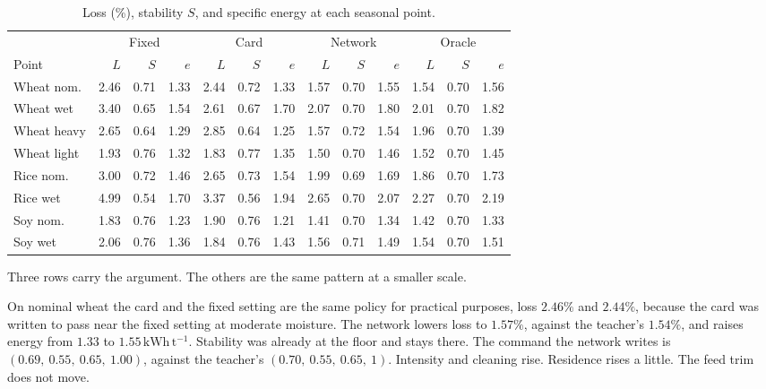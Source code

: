 \begin{table}[ht]
\centering
\caption{Loss (\%), stability \(S\), and specific energy at each seasonal point.}
\label{tab:pointsfull}
\small
\setlength{\tabcolsep}{4pt}
\begin{tabular}{@{}lrrrrrrrrrrrr@{}}
\toprule
& \multicolumn{3}{c}{Fixed} & \multicolumn{3}{c}{Card} & \multicolumn{3}{c}{Network} & \multicolumn{3}{c}{Oracle} \\
\cmidrule(lr){2-4}\cmidrule(lr){5-7}\cmidrule(lr){8-10}\cmidrule(lr){11-13}
Point & \(L\) & \(S\) & \(e\) & \(L\) & \(S\) & \(e\) & \(L\) & \(S\) & \(e\) & \(L\) & \(S\) & \(e\) \\
\midrule
Wheat nom. & 2.46 & 0.71 & 1.33 & 2.44 & 0.72 & 1.33 & 1.57 & 0.70 & 1.55 & 1.54 & 0.70 & 1.56 \\
Wheat wet & 3.40 & 0.65 & 1.54 & 2.61 & 0.67 & 1.70 & 2.07 & 0.70 & 1.80 & 2.01 & 0.70 & 1.82 \\
Wheat heavy & 2.65 & 0.64 & 1.29 & 2.85 & 0.64 & 1.25 & 1.57 & 0.72 & 1.54 & 1.96 & 0.70 & 1.39 \\
Wheat light & 1.93 & 0.76 & 1.32 & 1.83 & 0.77 & 1.35 & 1.50 & 0.70 & 1.46 & 1.52 & 0.70 & 1.45 \\
Rice nom. & 3.00 & 0.72 & 1.46 & 2.65 & 0.73 & 1.54 & 1.99 & 0.69 & 1.69 & 1.86 & 0.70 & 1.73 \\
Rice wet & 4.99 & 0.54 & 1.70 & 3.37 & 0.56 & 1.94 & 2.65 & 0.70 & 2.07 & 2.27 & 0.70 & 2.19 \\
Soy nom. & 1.83 & 0.76 & 1.23 & 1.90 & 0.76 & 1.21 & 1.41 & 0.70 & 1.34 & 1.42 & 0.70 & 1.33 \\
Soy wet & 2.06 & 0.76 & 1.36 & 1.84 & 0.76 & 1.43 & 1.56 & 0.71 & 1.49 & 1.54 & 0.70 & 1.51 \\
\bottomrule
\end{tabular}
\end{table}

Three rows carry the argument. The others are the same pattern at a smaller scale.

On nominal wheat the card and the fixed setting are the same policy for practical purposes, loss \(2.46\%\) and \(2.44\%\), because the card was written to pass near the fixed setting at moderate moisture. The network lowers loss to \(1.57\%\), against the teacher's \(1.54\%\), and raises energy from \(1.33\) to \(1.55\,\mathrm{kWh\,t^{-1}}\). Stability was already at the floor and stays there. The command the network writes is \((0.69,\ 0.55,\ 0.65,\ 1.00)\), against the teacher's \((0.70,\ 0.55,\ 0.65,\ 1)\). Intensity and cleaning rise. Residence rises a little. The feed trim does not move.

